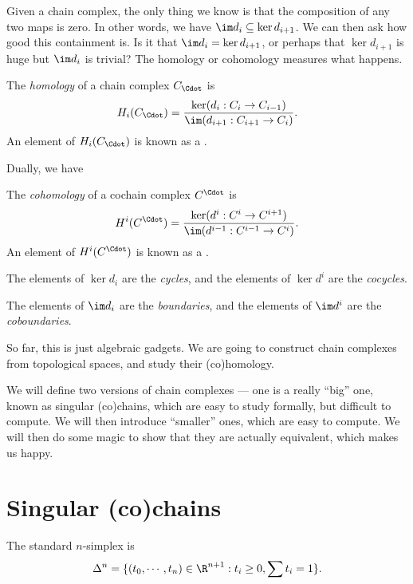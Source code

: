 \documentclass[a4paper]{article}
\begin{document}
Given a chain complex, the only thing we know is that the composition of any two maps is zero. In other words, we have $\im d_i \subseteq \ker d_{i + 1}$. We can then ask how good this containment is. Is it that $\im d_i = \ker d_{i + 1}$, or perhaps that $\ker d_{i + 1}$ is huge but $\im d_i$ is trivial? The homology or cohomology measures what happens.

\begin{defi}[Homology]
  The \emph{homology} of a chain complex $C_{\Cdot}$ is
  \[
    H_i(C_{\Cdot}) = \frac{\ker (d_i: C_i \to C_{i - 1})}{\im (d_{i + 1}: C_{i + 1} \to C_i)}.
  \]
  An element of $H_i(C_{\Cdot})$ is known as a .
\end{defi}

Dually, we have
\begin{defi}[Cohomology]
  The \emph{cohomology} of a cochain complex $C^{\Cdot}$ is
  \[
    H^i(C^{\Cdot}) = \frac{\ker (d^i: C^i \to C^{i + 1})}{\im (d^{i - 1}: C^{i - 1} \to C^i)}.
  \]
  An element of $H^i(C^{\Cdot})$ is known as a .
\end{defi}

\begin{defi}
  The elements of $\ker d_i$ are the \emph{cycles}, and the elements of $\ker d^i$ are the \emph{cocycles}.
\end{defi}

\begin{defi}
  The elements of $\im d_i$ are the \emph{boundaries}, and the elements of $\im d^i$ are the \emph{coboundaries}.
\end{defi}

So far, this is just algebraic gadgets. We are going to construct chain complexes from topological spaces, and study their (co)homology.

We will define two versions of chain complexes --- one is a really ``big'' one, known as singular (co)chains, which are easy to study formally, but difficult to compute. We will then introduce ``smaller'' ones, which are easy to compute. We will then do some magic to show that they are actually equivalent, which makes us happy.

\section{Singular (co)chains}
\begin{defi}
  The standard $n$-simplex is
  \[
    \Delta^n = \{(t_0, \cdots, t_n) \in \R^{n + 1} : t_i \geq 0, \sum t_i = 1\}.
  \]
\end{defi}
\end{document}
